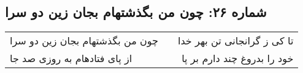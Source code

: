 \begin{center}
\section*{شماره ۲۶: چون من بگذشتهام بجان زین دو سرا}
\label{sec:026}
\begin{longtable}{l p{0.5cm} r}
چون من بگذشتهام بجان زین دو سرا
&&
تا کی ز گرانجانی تن بهر خدا
\\
از پای فتادهام به روزی صد جا
&&
خود را بدروغ چند دارم بر پا
\\
\end{longtable}
\end{center}
